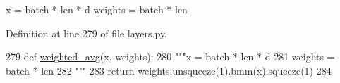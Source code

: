 \begin{DoxyVerb}x = batch * len * d
weights = batch * len
\end{DoxyVerb}
 

Definition at line 279 of file layers.\+py.


\begin{DoxyCode}
279 \textcolor{keyword}{def }\hyperlink{namespaceparlai_1_1agents_1_1drqa_1_1layers_a8d0e781e00db1c2d843b21a056554f65}{weighted\_avg}(x, weights):
280     \textcolor{stringliteral}{"""x = batch * len * d}
281 \textcolor{stringliteral}{    weights = batch * len}
282 \textcolor{stringliteral}{    """}
283     \textcolor{keywordflow}{return} weights.unsqueeze(1).bmm(x).squeeze(1)
284 \end{DoxyCode}
